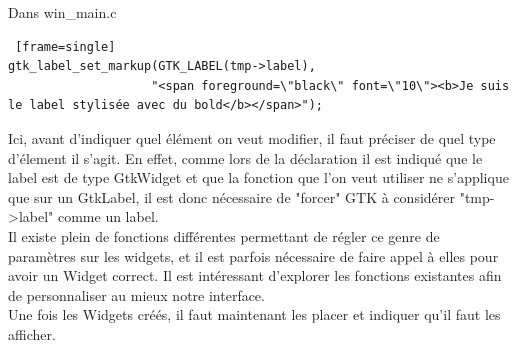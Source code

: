 \documentclass[11pt,french,a4paper]{report}
\begin{document}
\small Dans win\_main.c \normalsize
\begin{lstlisting} [frame=single]
gtk_label_set_markup(GTK_LABEL(tmp->label), 
                    "<span foreground=\"black\" font=\"10\"><b>Je suis le label stylisée avec du bold</b></span>"); 
\end{lstlisting}
Ici, avant d'indiquer quel élément on veut modifier, il faut préciser de quel type d'élement il s'agit.
En effet, comme lors de la déclaration il est indiqué que le label est de type GtkWidget et que la fonction que l'on veut utiliser 
ne s'applique que sur un GtkLabel, il est donc nécessaire de "forcer" GTK à considérer "tmp->label" comme un label.\\
Il existe plein de fonctions différentes permettant de régler ce genre de paramètres sur les widgets, et il est parfois nécessaire 
de faire appel à elles pour avoir un Widget correct. 
Il est intéressant d'explorer les fonctions existantes afin de personnaliser au mieux notre interface. \\
Une fois les Widgets créés, il faut maintenant les placer et indiquer qu'il faut les afficher. \\ 
\end{document}

